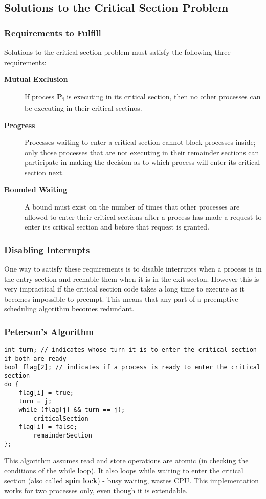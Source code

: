 \documentclass[11pt]{article}
\begin{document}
\subsection{Solutions to the Critical Section Problem}
\label{sec:orgd7d86a1}
\subsubsection{Requirements to Fulfill}
\label{sec:orgc6815db}
Solutions to the critical section problem must satisfy the following three requirements:
\begin{description}
\item[{\textbf{Mutual Exclusion}}] If process \textbf{P\textsubscript{i}} is executing in its critical section, then no other processes can be executing in their critical sectinos.
\item[{\textbf{Progress}}] Processes waiting to enter a critical section cannot block processes inside; only those processes that are not executing in their remainder sections can participate in making the decision as to which process will enter its critical section next.
\item[{\textbf{Bounded Waiting}}] A bound must exist on the number of times that other processes are allowed to enter their critical sections after a process has made a request to enter its critical section and before that request is granted.
\end{description}

\subsubsection{Disabling Interrupts}
\label{sec:orgb5b55c8}
One way to satisfy these requirements is to disable interrupts when a process is in the entry section and reenable them when it is in the exit secton.
However this is very impractical if the critical section code takes a long time to execute as it becomes impossible to preempt.
This means that any part of a preemptive scheduling algorithm becomes redundant. 

\subsubsection{Peterson's Algorithm}
\label{sec:orge47fe28}
\begin{verbatim}
int turn; // indicates whose turn it is to enter the critical section if both are ready
bool flag[2]; // indicates if a process is ready to enter the critical section
do {
    flag[i] = true;
    turn = j;
    while (flag[j] && turn == j);
        criticalSection
    flag[i] = false;
        remainderSection
};
\end{verbatim}
This algorithm assumes read and store operations are atomic (in checking the conditions of the while loop).
It also loops while waiting to enter the critical section (also called \textbf{spin lock}) - busy waiting, wastes CPU.
This implementation works for two processes only, even though it is extendable.
\end{document}

